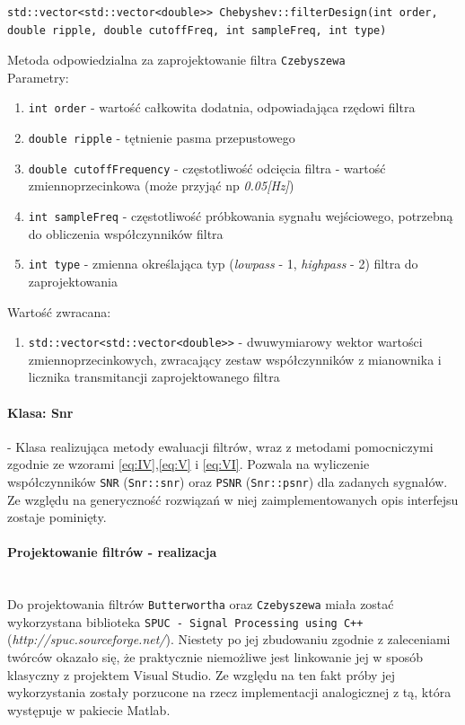 \documentclass[a4paper, 11pt]{article}
\begin{document}
\begin{lstlisting}
std::vector<std::vector<double>> Chebyshev::filterDesign(int order, 
double ripple, double cutoffFreq, int sampleFreq, int type)
\end{lstlisting}
Metoda odpowiedzialna za zaprojektowanie filtra \verb|Czebyszewa|\\

Parametry:
\begin{enumerate}
\item \verb|int order| - wartość całkowita dodatnia, odpowiadająca rzędowi filtra
\item \verb|double ripple| - tętnienie pasma przepustowego 
\item \verb|double cutoffFrequency| - częstotliwość odcięcia filtra - wartość zmiennoprzecinkowa (może przyjąć np \textit{0.05[Hz]})
\item \verb|int sampleFreq| - częstotliwość próbkowania sygnału wejściowego, potrzebną do obliczenia współczynników filtra
\item \verb|int type| - zmienna określająca typ (\textit{lowpass} - 1, \textit{highpass} - 2) filtra do zaprojektowania
\end{enumerate}
Wartość zwracana:
\begin{enumerate}
\item \verb|std::vector<std::vector<double>>| - dwuwymiarowy wektor wartości zmiennoprzecinkowych, zwracający zestaw współczynników z mianownika i licznika transmitancji zaprojektowanego filtra
\end{enumerate}

\paragraph{Klasa: Snr}
- Klasa realizująca metody ewaluacji filtrów, wraz z metodami pomocniczymi zgodnie ze wzorami \eqref{eq:IV},\eqref{eq:V} i \eqref{eq:VI}. Pozwala na wyliczenie współczynników \verb|SNR| (\verb|Snr::snr|) oraz \verb|PSNR| (\verb|Snr::psnr|) dla zadanych sygnałów. Ze względu na generyczność rozwiązań w niej zaimplementowanych opis interfejsu zostaje pominięty.

\paragraph{Projektowanie filtrów - realizacja}\mbox{} \\
Do projektowania filtrów \verb|Butterwortha| oraz \verb|Czebyszewa| miała zostać wykorzystana biblioteka \verb|SPUC - Signal Processing using C++| (\textit{http://spuc.sourceforge.net/}). Niestety po jej zbudowaniu zgodnie z zaleceniami twórców okazało się, że praktycznie niemożliwe jest linkowanie jej w sposób klasyczny z projektem Visual Studio. Ze względu na ten fakt próby jej wykorzystania zostały porzucone na rzecz implementacji analogicznej z tą, która występuje w pakiecie Matlab.
\end{document}
